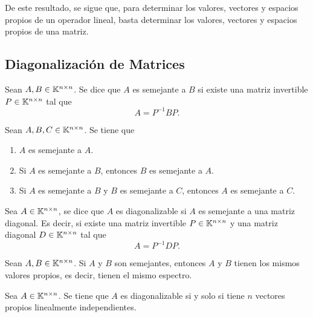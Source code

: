 \documentclass[a4,11pt]{aleph-notas}
\begin{document}
\begin{advertencia}
    De este resultado, se sigue que, para determinar los valores, vectores y espacios propios de un operador lineal, basta determinar los valores, vectores y espacios propios de una matriz.
\end{advertencia}

\subsection{Diagonalización de Matrices}

\begin{defi}
    Sean $A,B\in \Mat[\K]{n}{n}$. Se dice que $A$ es semejante a $B$ si existe una matriz invertible $P\in \Mat[\K]{n}{n}$ tal que
    \[
        A = P^{-1} B P.
    \]
\end{defi}


\begin{teo}
    Sean $A,B,C\in \Mat[\K]{n}{n}$. Se tiene que
    \begin{enumerate}
    \item 
        $A$ es semejante a $A$.
    \item
        Si $A$ es semejante a $B$, entonces $B$ es semejante a $A$.
    \item
        Si $A$ es semejante a $B$ y $B$ es semejante a $C$, entonces $A$ es semejante a $C$.
    \end{enumerate}
\end{teo}

\begin{defi}
    Sea $A\in \Mat[\K]{n}{n}$, se dice que $A$ es diagonalizable si $A$ es semejante a una matriz diagonal. Es decir, si existe una matriz invertible $P\in \Mat[\K]{n}{n}$ y una matriz diagonal $D\in \Mat[\K]{n}{n}$ tal que
    \[
        A = P^{-1} D P.
    \]
\end{defi}

\begin{teo}
    Sean $A,B\in \Mat[\K]{n}{n}$. Si $A$ y $B$ son semejantes, entonces $A$ y $B$ tienen los mismos valores propios, es decir, tienen el mismo espectro.
\end{teo}

\begin{teo}
    Sea $A\in \Mat[\K]{n}{n}$. Se tiene que $A$ es diagonalizable si y solo si tiene $n$ vectores propios linealmente independientes.
\end{teo}
\end{document}
